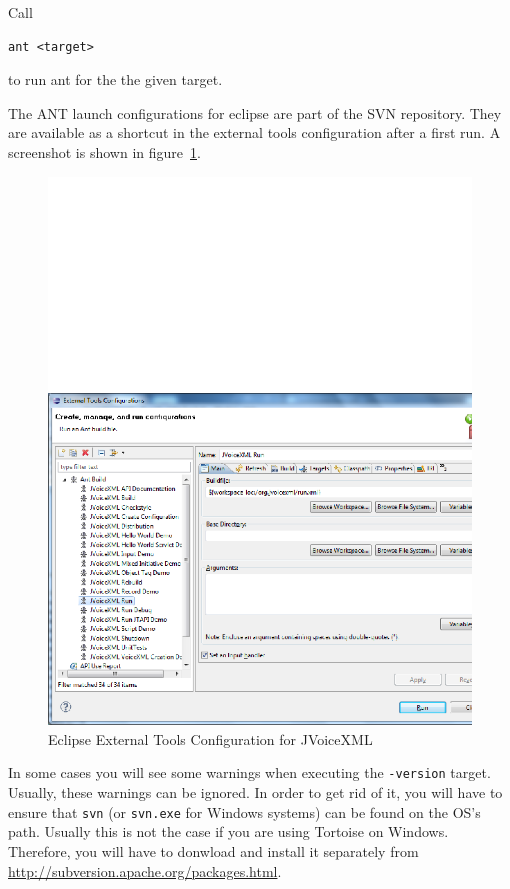 \documentclass[11pt,a4paper]{article}
\begin{document}
Call
\begin{lstlisting}
ant <target>
\end{lstlisting}
to run ant for the the given target.

The ANT launch configurations for eclipse are part of the SVN repository. They
are available as a shortcut in the external tools configuration after a first
run. A screenshot is shown in figure~\ref{fig:eclipse-launch}.
\begin{figure}
\includegraphics[width=\linewidth]{eclipse-launch.png}
\caption{Eclipse External Tools Configuration for JVoiceXML}
\label{fig:eclipse-launch}
\end{figure}

In some cases you will see some warnings when executing the
\lstinline{-version} target. Usually, these warnings can be ignored. In order
to get rid of it, you will have to ensure that \lstinline{svn} (or
\lstinline{svn.exe} for Windows systems) can be found on the OS's path. Usually
this is not the case if you are using Tortoise on Windows. Therefore, you will
have to donwload and install it separately from
\url{http://subversion.apache.org/packages.html}.
\end{document}
